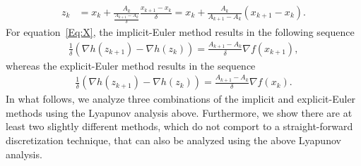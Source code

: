 \documentclass[11pt]{article}
\theoremstyle{plain}
\begin{document}
\begin{align*}
 z_{k} &= x_{k} + \frac{A_k}{\frac{A_{k+1} - A_k}{\delta}} \frac{x_{k+1} - x_k}{\delta}=  x_{k} + \frac{A_k}{A_{k+1} - A_k} (x_{k+1} - x_k).
\end{align*}
 For equation~\eqref{Eq:X}, the implicit-Euler method results in the following sequence
 \begin{align*}
 \frac{1}{\delta}(\nabla h(z_{k+1}) - \nabla h(z_k)) = \frac{A_{k+1} - A_k}{\delta} \nabla f(x_{k+1}),
 \end{align*}
 whereas the explicit-Euler method results in the sequence
 \begin{align*}
  \frac{1}{\delta}(\nabla h(z_{k+1}) - \nabla h(z_k)) = \frac{A_{k+1} - A_k}{\delta} \nabla f(x_{k}).
 \end{align*}
 In what follows, we analyze three combinations of the implicit and explicit-Euler methods using the Lyapunov analysis above. Furthermore, we show there are at least two slightly different methods, which do not comport to a straight-forward discretization technique, that can also be analyzed using the above Lyapunov analysis. 
\end{document}
